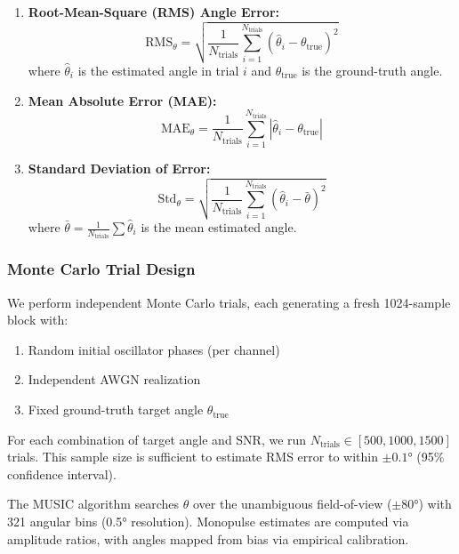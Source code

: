 \documentclass[10pt,a4paper]{article}
\begin{document}
\begin{enumerate}
\item \textbf{Root-Mean-Square (RMS) Angle Error:}
\begin{equation}
\text{RMS}_{\theta} = \sqrt{\frac{1}{N_{\text{trials}}} \sum_{i=1}^{N_{\text{trials}}} (\hat{\theta}_i - \theta_{\text{true}})^2}
\end{equation}
where $\hat{\theta}_i$ is the estimated angle in trial $i$ and $\theta_{\text{true}}$ is the ground-truth angle.

\item \textbf{Mean Absolute Error (MAE):}
\begin{equation}
\text{MAE}_{\theta} = \frac{1}{N_{\text{trials}}} \sum_{i=1}^{N_{\text{trials}}} |\hat{\theta}_i - \theta_{\text{true}}|
\end{equation}

\item \textbf{Standard Deviation of Error:}
\begin{equation}
\text{Std}_{\theta} = \sqrt{\frac{1}{N_{\text{trials}}} \sum_{i=1}^{N_{\text{trials}}} (\hat{\theta}_i - \bar{\theta})^2}
\end{equation}
where $\bar{\theta} = \frac{1}{N_{\text{trials}}} \sum \hat{\theta}_i$ is the mean estimated angle.
\end{enumerate}

\subsubsection{Monte Carlo Trial Design}

We perform independent Monte Carlo trials, each generating a fresh 1024-sample block with:
\begin{enumerate}
\item Random initial oscillator phases (per channel)
\item Independent AWGN realization
\item Fixed ground-truth target angle $\theta_{\text{true}}$
\end{enumerate}

For each combination of target angle and SNR, we run $N_{\text{trials}} \in [500, 1000, 1500]$ trials.
This sample size is sufficient to estimate RMS error to within $\pm 0.1°$ (95\% confidence interval).

The MUSIC algorithm searches $\theta$ over the unambiguous field-of-view ($\pm 80°$) with 321 angular bins (0.5° resolution).
Monopulse estimates are computed via amplitude ratios, with angles mapped from bias via empirical calibration.
\end{document}
